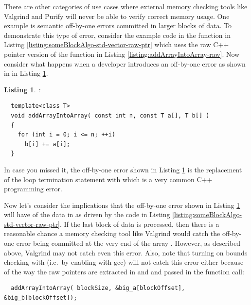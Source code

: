\documentclass[pdf,ps2pdf,11pt]{SANDreport}
\newtheorem{listing}{Listing}
\begin{document}
There are other categories of use cases where external memory checking
tools like Valgrind and Purify will never be able to verify correct
memory usage.  One example is semantic off-by-one errors committed in
larger blocks of data.  To demonstrate this type of error, consider
the example code in the function {} in
Listing {}\ref{listing:someBlockAlgo-std-vector-raw-ptr} which uses
the raw C++ pointer version of the function
{} in Listing
{}\ref{listing:addArrayIntoArray-raw}.  Now consider what happens when
a developer introduces an off-by-one error as shown in
{} in Listing
{}\ref{listing:addArrayIntoArray_rawError}.

\begin{listing}:\\
\label{listing:addArrayIntoArray_rawError}
{\small\begin{verbatim}
  template<class T>
  void addArrayIntoArray( const int n, const T a[], T b[] )
  {
    for (int i = 0; i <= n; ++i)
      b[i] += a[i];
  }
\end{verbatim}}
\end{listing}

In case you missed it, the off-by-one error shown in Listing
{}\ref{listing:addArrayIntoArray_rawError} is the replacement of the
loop termination statement {} with {}
which is a very common C++ programming error.

Now let's consider the implications that the off-by-one error shown in
Listing {}\ref{listing:addArrayIntoArray_rawError} will have of the
data in {} as driven by the code in Listing
{}\ref{listing:someBlockAlgo-std-vector-raw-ptr}.  If the last block
{} of data is processed, then there is a
reasonable chance a memory checking tool like Valgrind would catch the
off-by-one error being committed at the very end of the array
{}.  However, as described above, Valgrind may not
catch even this error.  Also, note that turning on bounds checking
with {} (i.e.\ by enabling
{} with gcc) will not catch this error
either because of the way the raw pointers are extracted in and and
passed in the function call:

{\small\begin{verbatim}
  addArrayIntoArray( blockSize, &big_a[blockOffset], &big_b[blockOffset]);
\end{verbatim}}
\end{document}
